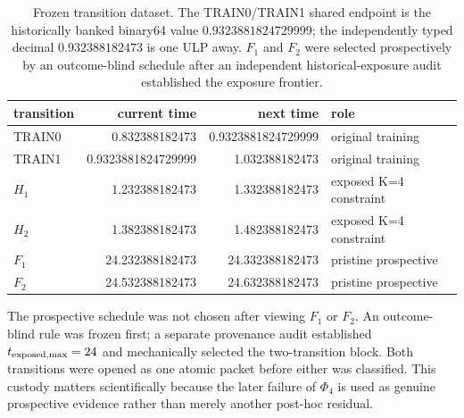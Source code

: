 \begin{table}[ht]
\centering
\caption{Frozen transition dataset.  The TRAIN0/TRAIN1 shared endpoint is the historically banked binary64 value $0.9323881824729999$; the independently typed decimal $0.932388182473$ is one ULP away.  $F_1$ and $F_2$ were selected prospectively by an outcome-blind schedule after an independent historical-exposure audit established the exposure frontier.}
\label{tab:transitions}
\begin{tabular}{lrrl}
\toprule
transition & current time & next time & role\\
\midrule
TRAIN0 & 0.832388182473 & 0.9323881824729999 & original training\\
TRAIN1 & 0.9323881824729999 & 1.032388182473 & original training\\
$H_1$ & 1.232388182473 & 1.332388182473 & exposed K=4 constraint\\
$H_2$ & 1.382388182473 & 1.482388182473 & exposed K=4 constraint\\
$F_1$ & 24.232388182473 & 24.332388182473 & pristine prospective\\
$F_2$ & 24.532388182473 & 24.632388182473 & pristine prospective\\
\bottomrule
\end{tabular}
\end{table}

The prospective schedule was not chosen after viewing $F_1$ or $F_2$.  An outcome-blind rule was frozen first; a separate provenance audit established $t_{\rm exposed,max}=24$ and mechanically selected the two-transition block.  Both transitions were opened as one atomic packet before either was classified.  This custody matters scientifically because the later failure of $\Phi_4$ is used as genuine prospective evidence rather than merely another post-hoc residual.

